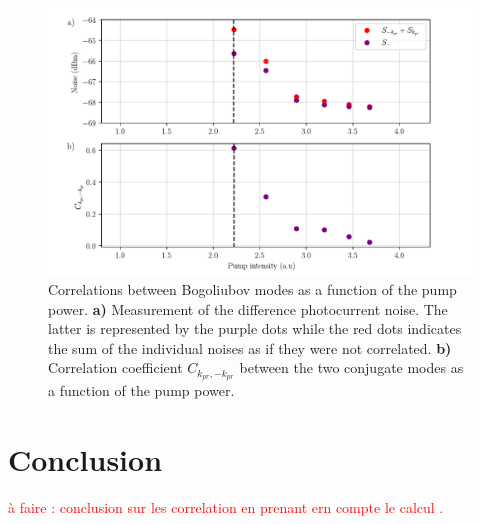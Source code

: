 \begin{figure}
    \centering
    \includegraphics[width=1\textwidth]{chap_correlation/fig/correlation_vs_bistab.pdf}
    \caption{Correlations between Bogoliubov modes as a function of the pump power. 
    \textbf{a)} Measurement of the difference photocurrent noise. The latter is represented by the purple dots while the red dots indicates the sum of the individual noises as if they were not correlated. \textbf{b)} Correlation coefficient $C_{k_{pr},-k_{pr}}$ between the two conjugate modes as a function of the pump power.}
    \label{fig:c_vs_bistab}
\end{figure}




\section{Conclusion}

\textcolor{red}{à faire : conclusion sur les correlation en prenant ern compte le calcul .}